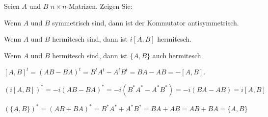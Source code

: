 Seien $A$ und $B$ $n\times n$-Matrizen. Zeigen Sie:
\begin{teilaufgaben}
\item Wenn $A$ und $B$ symmetrisch sind, dann ist der Kommutator
antisymmetrisch.
\item Wenn $A$ und $B$ hermitesch sind, dann ist $i[A,B]$ hermitesch.
\item Wenn $A$ und $B$ hermitesch sind, dann ist $\{A,B\}$ auch hermitesch.
\end{teilaufgaben}

\begin{loesung}
\begin{teilaufgaben}
\item
$[A,B]^t=(AB-BA)^t=B^tA^t-A^tB^t=BA-AB=-[A,B]$.
\item
$(i[A,B])^*=-i(AB-BA)^*=-i(B^*A^*-A^*B^*)=-i(BA-AB)=i[A,B]$
\item
$(\{A,B\})^*=(AB+BA)^*=B^*A^*+A^*B^*=BA+AB=AB+BA=\{A,B\}$
\end{teilaufgaben}
\end{loesung}

